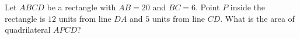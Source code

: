 Let $ABCD$ be a rectangle with $AB=20$ and $BC=6$. Point $P$ inside the rectangle is $12$ units from line $DA$ and $5$ units from line $CD$. What is the area of quadrilateral $APCD$?
